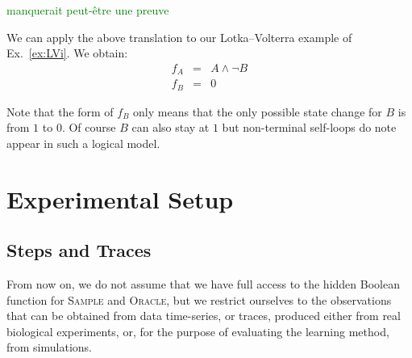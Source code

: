 \documentclass{llncs}
\newcommand{\sylvain}[1]{\textcolor{green}{#1}}
\begin{document}
\sylvain{manquerait peut-être une preuve}


\begin{example}
   We can apply the above translation to our Lotka--Volterra example of
   Ex.~\ref{ex:LVi}. We obtain:
   \begin{eqnarray*}
   f_A &=& A \wedge\neg B\\
   f_B &=& 0
   \end{eqnarray*}

   Note that the form of $f_B$ only means that the only possible state change
   for $B$ is from $1$ to $0$. Of course $B$ can also stay at $1$ but
   non-terminal self-loops do note appear in such a logical model.
\end{example}

\section{Experimental Setup}


\subsection{Steps and Traces}

From now on, we do not assume %
that we have full access to the hidden Boolean function for
\textsc{Sample} and \textsc{Oracle}, but we restrict ourselves to the observations that can be obtained from data time-series, or traces,
produced either from real biological experiments, or, for the purpose of evaluating the learning method, from simulations.
\end{document}

